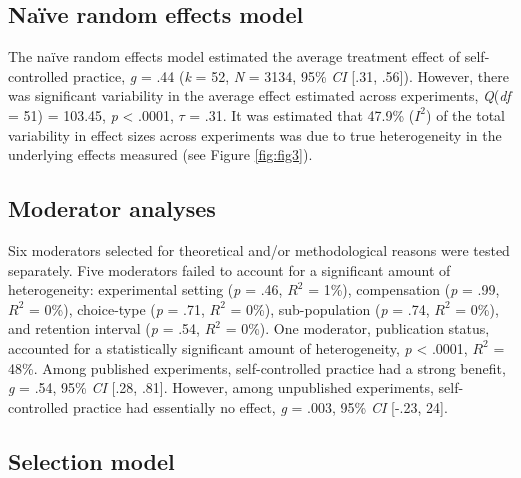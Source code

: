 \documentclass[
  english,
  man, donotrepeattitle,floatsintext]{apa7}
\begin{document}
\hypertarget{nauxefve-random-effects-model}{%
\subsection{Naïve random effects model}\label{nauxefve-random-effects-model}}

The naïve random effects model estimated the average treatment effect of self-controlled practice, \emph{g} = .44 (\emph{k} = 52, \emph{N} = 3134, 95\% \emph{CI} {[}.31, .56{]}). However, there was significant variability in the average effect estimated across experiments, \emph{Q}(\emph{df} = 51) = 103.45, \emph{p} \textless{} .0001, \(\tau\) = .31. It was estimated that 47.9\% (\(I^2\)) of the total variability in effect sizes across experiments was due to true heterogeneity in the underlying effects measured (see Figure \ref{fig:fig3}).

\hypertarget{moderator-analyses-1}{%
\subsection{Moderator analyses}\label{moderator-analyses-1}}

Six moderators selected for theoretical and/or methodological reasons were tested separately. Five moderators failed to account for a significant amount of heterogeneity: experimental setting (\emph{p} = .46, \(R^2\) = 1\%), compensation (\emph{p} = .99, \(R^2\) = 0\%), choice-type (\emph{p} = .71, \(R^2\) = 0\%), sub-population (\emph{p} = .74, \(R^2\) = 0\%), and retention interval (\emph{p} = .54, \(R^2\) = 0\%). One moderator, publication status, accounted for a statistically significant amount of heterogeneity, \emph{p} \textless{} .0001, \(R^2\) = 48\%. Among published experiments, self-controlled practice had a strong benefit, \emph{g} = .54, 95\% \emph{CI} {[}.28, .81{]}. However, among unpublished experiments, self-controlled practice had essentially no effect, \emph{g} = .003, 95\% \emph{CI} {[}-.23, 24{]}.

\hypertarget{selection-model}{%
\subsection{Selection model}\label{selection-model}}
\end{document}
